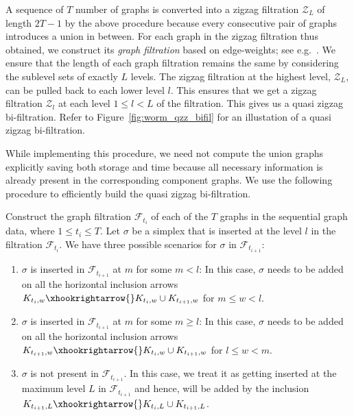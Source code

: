 \documentclass{article}
\theoremstyle{plain}
\theoremstyle{definition}
\theoremstyle{remark}
\newcommand{\tamal}[1]		{{ \textcolor{red} { T:#1}}}
\begin{document}
A sequence of $T$ number of graphs is converted into a zigzag filtration $\mathcal{Z}_{L}$ of length $2T-1$ by the above procedure because every consecutive pair of graphs introduces a union in between.
For each graph in the zigzag filtration thus obtained, we construct its \emph{graph filtration} based on edge-weights; see e.g.~\cite{dey_wang_2022_book, edelsbrunner2010computational}. We ensure that the length of each graph filtration remains the same by considering the sublevel sets of exactly $L$ levels.
The zigzag filtration at the highest level, $\mathcal{Z}_{L}$, can be pulled back to each lower level $l$. This ensures that we get a zigzag filtration $\mathcal{Z}_l$ at each level $1 \leq l < L$ of the filtration. This gives us a quasi zigzag bi-filtration. Refer to Figure~\ref{fig:worm_qzz_bifil} for an illustation of a quasi zigzag bi-filtration.
 
While implementing this procedure, we need not compute the union graphs explicitly saving both storage and time because all necessary information is already present in the corresponding component graphs. We use the following procedure to efficiently build the quasi zigzag bi-filtration.

Construct the graph filtration $\mathcal{F}_{t_i}$ of each of the $T$ graphs in the sequential graph data, where $1\leq t_i \leq T$. Let $\sigma$ be a simplex that is inserted at the level $l$ in the filtration $\mathcal{F}_{t_i}$. 
We have three possible scenarios for $\sigma$ in $\mathcal{F}_{t_{i+1}}$:
    \begin{enumerate}
    \item $\sigma$ is inserted in $\mathcal{F}_{t_{i+1}}$ at $m$ for some $m < l$: In this case, $\sigma$ needs to be added on all the horizontal inclusion arrows $K_{t_i, w} \xhookrightarrow{} K_{t_i, w} \cup K_{t_{i+1}, w}$ for $m \leqslant w < l$.
    
    \item $\sigma$ is inserted in $\mathcal{F}_{t_{i+1}}$ at $m$ for some $m \geqslant l$: In this case, $\sigma$ needs to be added on all the horizontal inclusion arrows $K_{t_{i+1}, w} \xhookrightarrow{} K_{t_i, w} \cup K_{t_{i+1}, w}$ for $l \leqslant w < m$.
    
    \item $\sigma$ is not present in $\mathcal{F}_{t_{i+1}}$. In this case, we treat it as getting inserted at the maximum level $L$ in $\mathcal{F}_{t_{i+1}}$ and hence, will be added by the inclusion $K_{t_{i+1}, L} \xhookrightarrow{} K_{t_i, L} \cup K_{t_{i+1}, L}$.
\end{enumerate}
\end{document}
